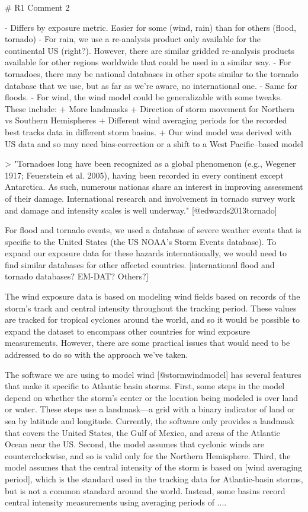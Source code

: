 # R1 Comment 2


- Differs by exposure metric. Easier for some (wind, rain) than for others
(flood, tornado)
- For rain, we use a re-analysis product only available for the continental US
(right?). However, there are similar gridded re-analysis products available for
other regions worldwide that could be used in a similar way.
- For tornadoes, there may be national databases in other spots similar to the
tornado database that we use, but as far as we're aware, no international one.
- Same for floods. 
- For wind, the wind model could be generalizable with some tweaks. These
include:
  + More landmasks
  + Direction of storm movement for Northern vs Southern Hemispheres
  + Different wind averaging periods for the recorded best tracks data in
  different storm basins.
  + Our wind model was derived with US data and so may need bias-correction or a
  shift to a West Pacific--based model

> "Tornadoes long have been recognized as a global phenomenon (e.g., Wegener
1917; Feuerstein et al. 2005), having been recorded in every continent except
Antarctica. As such, numerous nationas share an interest in improving assessment
of their damage. International research and involvement in tornado survey work
and damage and intensity scales is well underway." [@edwards2013tornado]

For flood and tornado events, we used a database of severe weather events that
is specific to the United States (the US NOAA's Storm Events database). To
expand our exposure data for these hazards internationally, we would need to
find similar databases for other affected countries. [international flood and
tornado databases? EM-DAT? Others?]

The wind exposure data is based on modeling wind fields based on records of the
storm's track and central intensity throughout the tracking period. These values
are tracked for tropical cyclones around the world, and so it would be possible
to expand the dataset to encompass other countries for wind exposure
measurements. However, there are some practical issues that would need to be
addressed to do so with the approach we've taken.

The software we are using to model wind [@stormwindmodel] has several features
that make it specific to Atlantic basin storms. First, some steps in the model
depend on whether the storm's center or the location being modeled is over land
or water. These steps use a landmask---a grid with a binary indicator of land or
sea by latitude and longitude. Currently, the software only provides a landmask
that covers the United States, the Gulf of Mexico, and areas of the Atlantic
Ocean near the US. Second, the model assumes that cyclonic winds are
counterclockwise, and so is valid only for the Northern Hemisphere. Third, the
model assumes that the central intensity of the storm is based on [wind
averaging period], which is the standard used in the tracking data for
Atlantic-basin storms, but is not a common standard around the world. Instead,
some basins record central intensity measurements using averaging periods of
....

